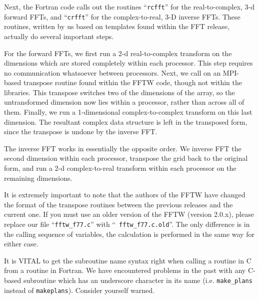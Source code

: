 Next, the Fortran code calls out the routines ``{\tt rcfft}'' for the
real-to-complex, 3-d forward FFTs, and ``{\tt crfft}'' for the 
complex-to-real, 3-D inverse FFTs.  These routines, written by us based on
templates found within the FFT release, actually do several important
steps.

For the forward FFTs, we first run a 2-d real-to-complex transform on
the dimensions which are stored completely within each processor.
This step requires no communication whatsoever between processors.
Next, we call on an MPI-based transpose routine found within the FFTW
code, though not within the libraries.  This transpose switches two of
the dimensions of the array, so the untransformed dimension now lies
within a processor, rather than across all of them.  Finally, we run a
1-dimensional complex-to-complex transform on this last dimension.
The resultant complex data structure is left in the transposed form,
since the transpose is undone by the inverse FFT.  

The inverse FFT works in essentially the opposite order.  We inverse
FFT the second dimension within each processor, transpose the grid
back to the original form, and run a 2-d complex-to-real transform
within each processor on the remaining dimensions.

It is extremely important to note that the authors of the FFTW have
changed the format of the transpose routines between the previous
releases and the current one.  If you must use an older version of the
FFTW (version 2.0.x), please replace our file ``{\tt fftw\_f77.c}'' with ``{\tt
fftw\_f77.c.old}''.  The only difference is in the calling sequence of
variables, the calculation is performed in the same way for either case.

It is VITAL to get the subroutine name syntax right when calling a routine in C from a
routine in Fortran.  We have encountered problems in the past with
any C-based subroutine which has an underscore character in
its name (i.e. {\tt make\_plans} instead of {\tt makeplans}).  Consider yourself warned.
